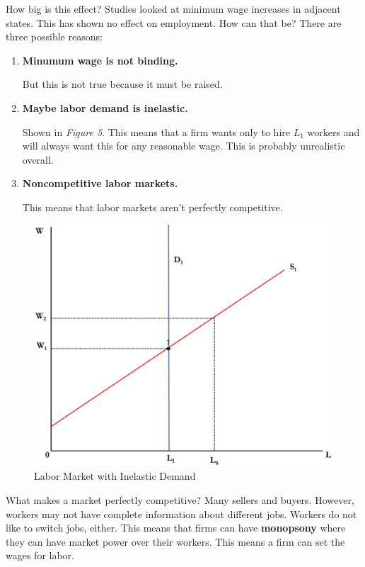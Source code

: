 \documentclass{article}
\begin{document}
How big is this effect? Studies looked at minimum wage increases in adjacent
states. This has shown no effect on employment. How can that be? There are three
possible reasons:

\begin{enumerate}
    \item \textbf{Minumum wage is not binding.} 
    
    But this is not true because it must be raised.
    
    \item \textbf{Maybe labor demand is inelastic. }
    
    Shown in \textit{Figure 5}. This means that a firm wants only to hire
    $L_{1}$ workers and will always want this for any reasonable wage. This is
    probably unrealistic overall.
    
    \item \textbf{Noncompetitive labor markets.}
    
    This means that labor markets aren't perfectly competitive.
    
\end{enumerate}

\begin{figure}[H]
    \centering
    \includegraphics[scale=0.33]{"Figure 5"}
    \caption{Labor Market with Inelastic Demand}
\end{figure}

What makes a market perfectly competitive? Many sellers and buyers. However,
workers may not have complete information about different jobs. Workers do not
like to switch jobs, either. This means that firms can have \textbf{monopsony}
where they can have market power over their workers. This means a firm can set
the wages for labor.
\end{document}
